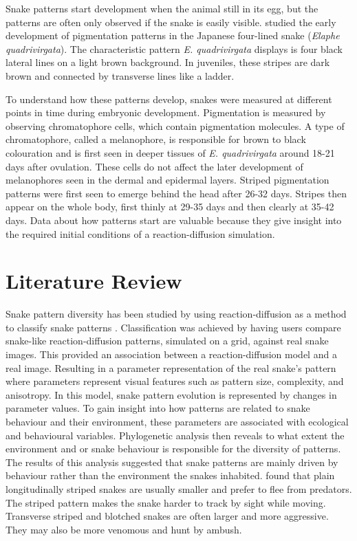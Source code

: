 Snake patterns start development when the animal still in its egg, but the patterns are often only observed if the snake is easily visible. \citet{murakami2018} studied the early development of pigmentation patterns in the Japanese four-lined snake (\textit{Elaphe quadrivirgata}). The characteristic pattern \textit{E. quadrivirgata} displays is four black lateral lines on a light brown background. In juveniles, these stripes are dark brown and connected by transverse lines like a ladder. 
 
To understand how these patterns develop, snakes were measured at different points in time during embryonic development. Pigmentation is measured by observing chromatophore cells, which contain pigmentation molecules. A type of chromatophore, called a melanophore, is responsible for brown to black colouration and is first seen in deeper tissues of \textit{E. quadrivirgata} around 18-21 days after ovulation. These cells do not affect the later development of melanophores seen in the dermal and epidermal layers. Striped pigmentation patterns were first seen to emerge behind the head after 26-32 days. Stripes then appear on the whole body, first thinly at 29-35 days and then clearly at 35-42 days. Data about how patterns start are valuable because they give insight into the required initial conditions of a reaction-diffusion simulation.

\section{Literature Review}
Snake pattern diversity has been studied by using reaction-diffusion as a method to classify snake patterns \citep{Allen2013}. Classification was achieved by having users compare snake-like reaction-diffusion patterns, simulated on a grid, against real snake images. This provided an association between a reaction-diffusion model and a real image. Resulting in a parameter representation of the real snake’s pattern where parameters represent visual features such as pattern size, complexity, and anisotropy. In this model, snake pattern evolution is represented by changes in parameter values. To gain insight into how patterns are related to snake behaviour and their environment, these parameters are associated with ecological and behavioural variables. Phylogenetic analysis then reveals to what extent the environment and or  snake behaviour is responsible for the diversity of patterns. The results of this analysis suggested that snake patterns are mainly driven by behaviour rather than the environment the snakes inhabited. \citet{Allen2013} found that plain longitudinally striped snakes are usually smaller and prefer to flee from predators. The striped pattern makes the snake harder to track by sight while moving. Transverse striped and blotched snakes are often larger and more aggressive. They may also be more venomous and hunt by ambush.

